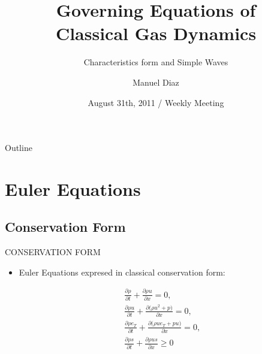 \documentclass{beamer}
\title[Governing Equations] %
{Governing Equations of \\ Classical Gas Dynamics}
\subtitle
{Characteristics form and Simple Waves} %
\author[Manuel Diaz] %
{Manuel Diaz\inst{1} }
\institute[National Taiwan University] %
{
  \inst{1}%
  National Taiwan University\\
  Institute of Applied Mechanics}
\date[August 31th, 2011] %
{August 31th, 2011 / Weekly Meeting}
\begin{document}
\begin{frame}
  \titlepage
\end{frame}

\begin{frame}{Outline}
  \tableofcontents
\end{frame}




\section{Euler Equations}

\subsection{Conservation Form}

\begin{frame}{CONSERVATION FORM}
  \begin{itemize}
   \item Euler Equations expresed in classical conservation form:
  \end{itemize}
  \begin{eqnarray}
    &&\frac{\partial{\rho}}{\partial{t}}+\frac{\partial{{\rho}{u}}}{\partial{x}}=0, \\
    &&\frac{\partial{{\rho}u}}{\partial{t}}+\frac{\partial{({\rho}{u^2}+p})}{\partial{x}}=0, \\
    &&\frac{\partial{\rho}e_T}{\partial{t}}+\frac{\partial{({\rho}{u}e_T+pu})}{\partial{x}}=0, \\
    &&\frac{\partial{\rho}s}{\partial{t}}+\frac{\partial{{\rho}{u}s}}{\partial{x}}\geq 0
  \end{eqnarray} 
\end{frame}
\end{document}

